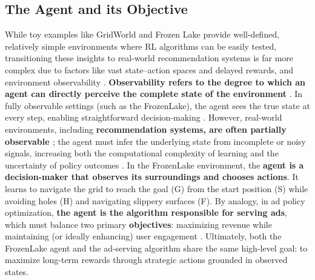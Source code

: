 \documentclass[final]{anthology-ch}         %
\begin{document}
\subsection{The Agent and its Objective}
While toy examples like GridWorld \cite{Sutton1998}  and Frozen Lake \cite{frozenlake} provide well-defined, relatively simple environments where RL algorithms can be easily tested, transitioning these insights to real-world recommendation systems is far more complex due to factors like vast state–action spaces and delayed rewards, and environment observability \cite{dulac2019challenges, kaelbling1996reinforcement}. \textbf{Observability refers to the degree to which an agent can directly perceive the complete state of the environment} \cite{kaelbling1998planning}. In fully observable settings (such as the FrozenLake), the agent sees the true state at every step, enabling straightforward decision-making \cite{kaelbling1998planning}. However, real-world environments, including \textbf{recommendation systems, are often partially observable \cite{lu2016partially}}; the agent must infer the underlying state from incomplete or noisy signals, increasing both the computational complexity of learning and the uncertainty of policy outcomes \cite{wu2021partially}. In the FrozenLake environment, the \textbf{agent is a decision-maker that observes its surroundings and chooses actions}. It learns to navigate the grid to reach the goal (\textcolor[HTML]{FF4500}{G}) from the start position (\textcolor[HTML]{228B22}{S}) while avoiding holes (\textcolor[HTML]{FF0000}{H}) and navigating slippery surfaces (\textcolor[HTML]{1E90FF}{F}). By analogy, in ad policy optimization, \textbf{the agent is the algorithm responsible for serving ads}, which must balance two primary \textbf{objectives}: maximizing revenue while maintaining (or ideally enhancing) user engagement \cite{Theocharous-2015, zou2019reinforcement}. Ultimately, both the FrozenLake agent and the ad-serving algorithm share the same high-level goal: to maximize long-term rewards through strategic actions grounded in observed states.
\end{document}
